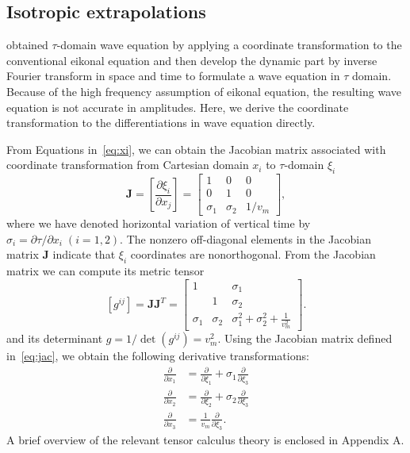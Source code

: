 \subsection{Isotropic extrapolations}

\cite{alkhalifah:105} obtained $\tau$-domain wave equation by applying a coordinate transformation to the conventional eikonal equation and then
develop the dynamic part by inverse Fourier transform in space and time to formulate a wave equation in $\tau$ domain.
Because of the high frequency assumption of eikonal equation, the resulting wave equation is not accurate in amplitudes.
Here, we derive the coordinate transformation to the differentiations in wave equation directly.

From Equations in~\ref{eq:xi}, we can obtain the Jacobian matrix associated with coordinate transformation from Cartesian domain $x_i$ to $\tau$-domain $\xi_i$
\begin{equation}
  \label{eq:jac}
  \mathbf{J} = \left[\frac{\partial \xi_i}{\partial x_j}\right] = \begin{bmatrix} 1 & 0 & 0 \\ 0 & 1 & 0 \\ \sigma_1 & \sigma_2 & 1 / v_m\end{bmatrix} ,
\end{equation}
where we have denoted horizontal variation of vertical time by $\sigma_i = \partial \tau / \partial x_i \; (i=1,2)$.
The nonzero off-diagonal elements in the Jacobian matrix $\mathbf{J}$ indicate that $\xi_i$ coordinates are nonorthogonal.
From the Jacobian matrix we can compute its metric tensor
\begin{equation}
\label{eq:gco}
[g^{ij}] = \mathbf{J} \mathbf{J}^T =
\begin{bmatrix}
  1 & & \sigma_1 \\
  & 1 & \sigma_2 \\
  \sigma_1 & \sigma_2 & \sigma_1^2 + \sigma_2^2 + \frac{1}{v_m^2}
\end{bmatrix} .
\end{equation}
and its determinant $g = 1 / \det(g^{ij}) = v_m^2$.
Using the Jacobian matrix defined in~\ref{eq:jac}, we obtain the following derivative transformations:
\begin{align}
\label{eq:chain}
\frac{\partial}{\partial x_1} & = \frac{\partial}{\partial \xi_1} + \sigma_1\frac{\partial}{\partial \xi_3} \nonumber \\
\frac{\partial}{\partial x_2} & = \frac{\partial}{\partial \xi_2} + \sigma_2\frac{\partial}{\partial \xi_3} \\
\frac{\partial}{\partial x_3} & = \frac{1}{v_m} \frac{\partial}{\partial \xi_3} \nonumber .
\end{align}
A brief overview of the relevant tensor calculus theory is enclosed in Appendix A.

